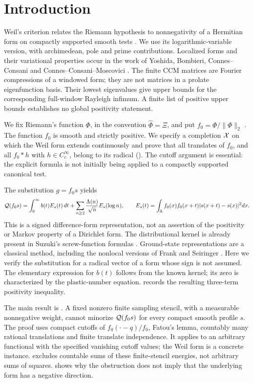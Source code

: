 \section{Introduction}\label{sec:intro}

Weil's criterion relates the Riemann hypothesis to nonnegativity of a
Hermitian form on compactly supported smooth tests
\cite{Weil1952,BOMBIERI-WEILQF-2000}. We use its logarithmic-variable
version, with archimedean, pole and prime contributions. Localized forms
and their variational properties occur in the work of Yoshida,
Bombieri, Connes--Consani and Connes--Consani--Moscovici
\cite{YOSHIDA-HERMITIAN-1992,BOMBIERI-WEILQF-2000,CC-WEILPOS-2020,CCM-ZST-2025}.
The finite CCM matrices are Fourier compressions of a windowed form;
they are not matrices in a prolate eigenfunction basis. Their lowest
eigenvalues give upper bounds for the corresponding full-window
Rayleigh infimum. A finite list of positive upper bounds establishes no
global positivity statement.

We fix Riemann's function $\Phi$, in the convention
$\widehat\Phi=\Xi$, and put $f_0=\Phi/\|\Phi\|_2$
\cite{Riemann1859,CCM-ZST-2025}. The function $f_0$ is smooth and strictly
positive. We specify a completion $\mathcal X$ on which the Weil form extends
continuously and prove that all translates of $f_0$, and all $f_0*h$ with
$h\in C_c^\infty$, belong to its radical (). The cutoff
argument is essential: the explicit formula is not initially being
applied to a compactly supported canonical test.

The substitution $g=f_0s$ yields
\[
 \mathcal Q(f_0s)=\int_0^\infty b(t)E_s(t)\,dt
          +\sum_{n\ge2}\frac{\Lambda(n)}{\sqrt n}E_s(\log n),
 \qquad
 E_s(t)=\int_{\mathbb R}f_0(x)f_0(x+t)|s(x+t)-s(x)|^2dx.
\]
This is a signed difference-form representation, not an assertion of the
positivity or Markov property of a Dirichlet form. The distributional
kernel is already present in Suzuki's screw-function formulas
\cite[\S3.5]{Suzuki2023Screw}\cite[\S2.5]{Suzuki2026}. Ground-state
representations are a classical method, including the nonlocal versions
of Frank and Seiringer \cite{FrankSeiringer2008}. Here we verify the
substitution for a radical vector of a form whose sign is not assumed.
The elementary expression for $b(t)$ follows from the known kernel;
its zero is characterized by the plastic-number equation.
 records the resulting three-term positivity inequality.

The main result is . A fixed nonzero finite sampling
stencil, with a measurable nonnegative weight, cannot minorize
$\mathcal Q(f_0s)$ for every compact smooth profile $s$. The proof uses compact
cutoffs of $f_0(\cdot-q)/f_0$, Fatou's lemma, countably many rational
translations and finite translate independence. It applies to an
arbitrary functional with the specified vanishing cutoff values; the
Weil form is a concrete instance.  excludes countable
sums of these finite-stencil energies, not arbitrary sums of squares.
 shows why the obstruction does not imply that the
underlying form has a negative direction.

